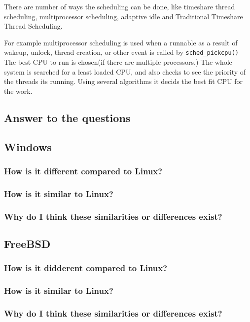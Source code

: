 \documentclass[letterpaper,10pt,draftclsnofoot,onecolumn]{IEEEtran}
\begin{document}
There are number of ways the scheduling can be done, like timeshare thread scheduling, multiprocessor scheduling, adaptive idle and Traditional Timeshare Thread Scheduling.

For example multiprocessor scheduling is used when a runnable as a result of wakeup, unlock, thread creation, or other event is called by \verb|sched_pickcpu()| The best CPU to run is chosen(if there are multiple processors.) The whole system is searched for a least loaded CPU, and also checks to see the priority of the threads its running. Using several algorithms it decids the best fit CPU for the work.

\subsection*{Answer to the questions}
\subsection*{Windows}
\subsubsection*{How is it different compared to Linux?}
\subsubsection*{How is it similar to Linux?}
\subsubsection*{Why do I think these similarities or differences exist?}

\subsection*{FreeBSD}
\subsubsection*{How is it didderent compared to Linux?}
\subsubsection*{How is it similar to Linux?}
\subsubsection*{Why do I think these similarities or differences exist?}
\end{document}
